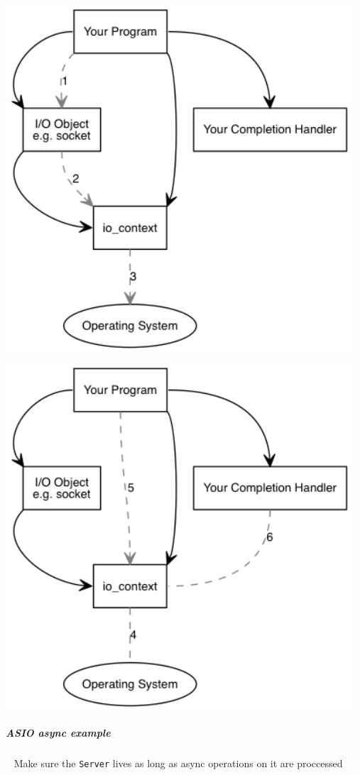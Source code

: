 \documentclass[11pt,twoside,landscape]{article}
\begin{document}
\begin{multicols}{2}
{
\begin{center}
\includegraphics[width=.9\linewidth]{img/asio_async_operation.png}
\end{center}
\label{fig:asio-async-operations-part-1}
}

{
\begin{center}
\includegraphics[width=.9\linewidth]{img/async_operations_2.png}
\end{center}
\label{fig:asio-async-operations-part-2}
}
\subparagraph{ASIO async example} \
\label{sec:org983416b}
Make sure the \texttt{Server} lives as long as async operations on it are proccessed


\end{multicols}
\end{document}
